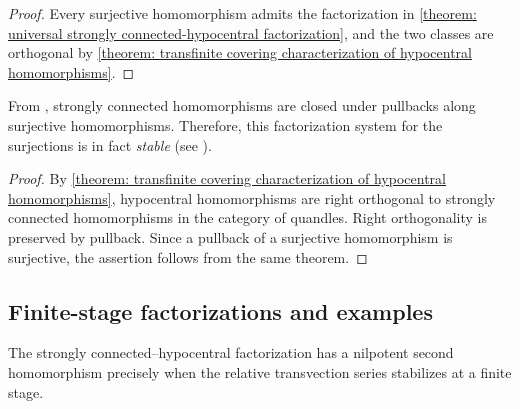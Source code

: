 \begin{proof}
Every surjective homomorphism admits the factorization in \cref{theorem: universal strongly connected-hypocentral factorization}, and the two classes are orthogonal by \cref{theorem: transfinite covering characterization of hypocentral homomorphisms}.
\end{proof}

\begin{rem}
    From \cite[Proposition 3.32]{preprint_yuki_tomoki_2026_relativization_of_symmetries_on_quandles}, strongly connected homomorphisms are closed under pullbacks along surjective homomorphisms.
    Therefore, this factorization system for the surjections is in fact \textit{stable} (see \cite[\href{https://ncatlab.org/nlab/show/stable+factorization+system}{stable factorization system}]{preprint_nlab_2008_nlab}).
\end{rem}


\begin{proof}
By \cref{theorem: transfinite covering characterization of hypocentral homomorphisms}, hypocentral homomorphisms are right orthogonal to strongly connected homomorphisms in the category of quandles. Right orthogonality is preserved by pullback. Since a pullback of a surjective homomorphism is surjective, the assertion follows from the same theorem.
\end{proof}




\subsection{Finite-stage factorizations and examples}
\label{subsection: finite-stage strongly connected-nilpotent factorizations}

The strongly connected--hypocentral factorization has a nilpotent second homomorphism precisely when the relative transvection series stabilizes at a finite stage.

